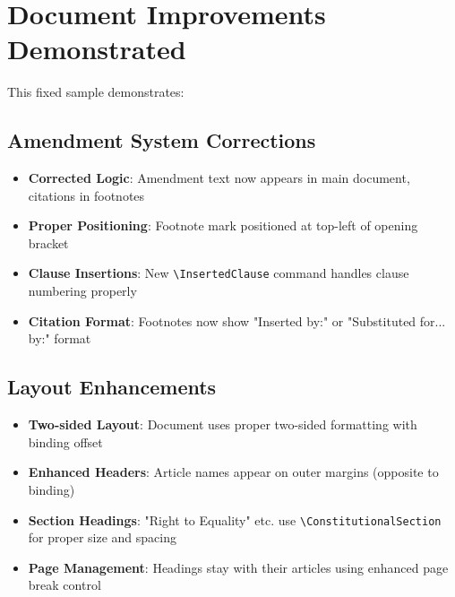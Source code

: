 \documentclass[showamendments,twoside]{soi}
\begin{document}
\tableofcontents
\clearpage










\clearpage
\appendix


\clearpage
\section*{Document Improvements Demonstrated}

This fixed sample demonstrates:

\subsection*{Amendment System Corrections}
\begin{itemize}
\item \textbf{Corrected Logic}: Amendment text now appears in main document, citations in footnotes
\item \textbf{Proper Positioning}: Footnote mark positioned at top-left of opening bracket
\item \textbf{Clause Insertions}: New \texttt{\textbackslash{}InsertedClause} command handles clause numbering properly
\item \textbf{Citation Format}: Footnotes now show "Inserted by:" or "Substituted for... by:" format
\end{itemize}

\subsection*{Layout Enhancements}
\begin{itemize}
\item \textbf{Two-sided Layout}: Document uses proper two-sided formatting with binding offset
\item \textbf{Enhanced Headers}: Article names appear on outer margins (opposite to binding)
\item \textbf{Section Headings}: "Right to Equality" etc. use \texttt{\textbackslash{}ConstitutionalSection} for proper size and spacing
\item \textbf{Page Management}: Headings stay with their articles using enhanced page break control
\end{itemize}
\end{document}
